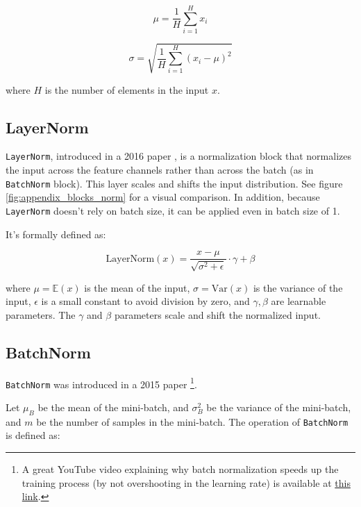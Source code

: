 \[ \mu = \frac{1}{H} \sum_{i=1}^{H} x_i \]

\[ \sigma = \sqrt{\frac{1}{H} \sum_{i=1}^{H} (x_i - \mu)^2} \]

where $H$ is the number of elements in the input $x$.






\subsection*{LayerNorm}

\texttt{LayerNorm}, introduced in a 2016 paper \cite{layernorm}, is a normalization block that normalizes the input across the feature channels rather than across the batch (as in \texttt{BatchNorm} block). This layer scales and shifts the input distribution. See figure \ref{fig:appendix_blocks_norm} for a visual comparison. In addition, because \texttt{LayerNorm} doesn't rely on batch size, it can be applied even in batch size of 1.

It's formally defined as:

\begin{equation*}
    \text{LayerNorm}(x) = \frac{x - \mu}{\sqrt{\sigma^2 + \epsilon}} \cdot \gamma + \beta
\end{equation*}

where $\mu = \mathbb{E}(x)$ is the mean of the input, $\sigma = \text{Var} (x)$ is the variance of the input, $\epsilon$ is a small constant to avoid division by zero, and $\gamma, \beta$ are learnable parameters. The $\gamma$ and $\beta$ parameters scale and shift the normalized input.










\subsection*{BatchNorm}

\texttt{BatchNorm} was introduced in a 2015 paper \cite{batchnorm}\footnote{A great YouTube video explaining why batch normalization speeds up the training process (by not overshooting in the learning rate) is available at \href{https://www.youtube.com/watch?v=DtEq44FTPM4}{this link}.}.

Let $\mu_B$ be the mean of the mini-batch, and $\sigma^2_B$ be the variance of the mini-batch, and $m$ be the number of samples in the mini-batch. The operation of \texttt{BatchNorm} is defined as:

